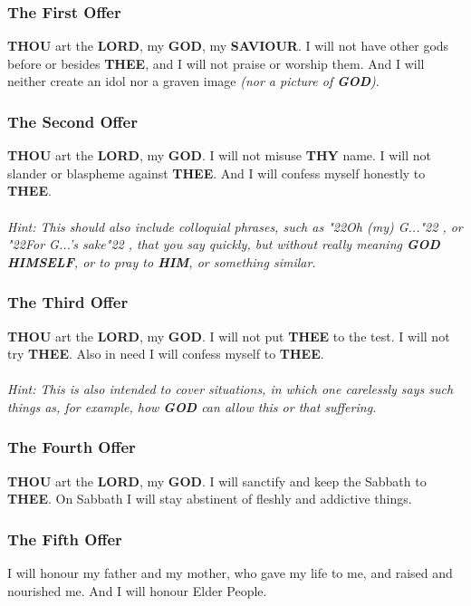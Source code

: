 \documentclass[12pt,a5paper]{article}
\newcommand{\God}[0]{\textbf{GOD}}
\newcommand{\Him}[0]{\textbf{HIM}}
\newcommand{\Himself}[0]{\textbf{HIMSELF}}
\newcommand{\Lord}[0]{\textbf{LORD}}
\newcommand{\Saviour}[0]{\textbf{SAVIOUR}}
\newcommand{\Thee}[0]{\textbf{THEE}}
\newcommand{\Thou}[0]{\textbf{THOU}}
\newcommand{\Thy}[0]{\textbf{THY}}
\newcommand{\q}[1]{\char"22{#1}\char"22 }
\begin{document}
	\subsubsection{The First Offer}
		{\Thou} art the {\Lord},
		my {\God},
		my {\Saviour}.
		I will not have other gods before or besides {\Thee},
		and I will not praise or worship them.
		And I will neither create an idol nor a graven image
		\textit{(nor a picture of {\God})}.
		
	\subsubsection{The Second Offer}
		{\Thou} art the {\Lord},
		my {\God}.
		I will not misuse {\Thy} name.
		I will not slander or blaspheme against {\Thee}.
		And I will confess myself honestly to {\Thee}.
		\\
		\\
		\textit{Hint:
		This should also include colloquial phrases,
		such as \q{Oh (my) G...},
		or \q{For G...'s sake},
		that you say quickly,
		but without really meaning {\God} {\Himself},
		or to pray to {\Him},
		or something similar.}
			
	\subsubsection{The Third Offer}
		{\Thou} art the {\Lord},
		my {\God}.
		I will not put {\Thee} to the test.
		I will not try {\Thee}.
		Also in need I will confess myself to {\Thee}.
		\\
		\\
		\textit{Hint:
		This is also intended to cover situations,
		in which one carelessly says such things as,
		for example,
		how {\God} can allow this or that suffering.}
		
	\subsubsection{The Fourth Offer}
		{\Thou} art the {\Lord},
		my {\God}.
		I will sanctify and keep the Sabbath to {\Thee}.
		On Sabbath I will stay abstinent of fleshly
		and addictive things.
		
	\subsubsection{The Fifth Offer}
		I will honour my father and my mother,
		who gave my life to me,
		and raised and nourished me.
		And I will honour Elder People.
			
\end{document}
